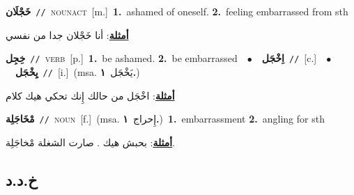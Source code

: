\documentclass[10pt,a4paper,twoside]{article} %
\begin{document}
\begin{multicols}{2}
{\setlength\topsep{0pt}\textbf{\foreignlanguage{arabic}{خَجْلَان}}\ {\color{gray}\texttt{//}\color{black}}\ \textsc{noun\textunderscore act}\ [m.]\ \textbf{1.}~ashamed of oneself.  \textbf{2.}~feeling embarrassed from sth\  \begin{flushright}\color{gray}\foreignlanguage{arabic}{\textbf{\underline{\foreignlanguage{arabic}{أمثلة}}}: أنا خَجْلان جدا من نفسي}\end{flushright}\color{black}} \vspace{2mm}

{\setlength\topsep{0pt}\textbf{\foreignlanguage{arabic}{خِجِل}}\ {\color{gray}\texttt{//}\color{black}}\ \textsc{verb}\ [p.]\ \textbf{1.}~be ashamed.  \textbf{2.}~be embarrassed\ \ $\bullet$\ \ \setlength\topsep{0pt}\textbf{\foreignlanguage{arabic}{اِخْجَل}}\ {\color{gray}\texttt{//}\color{black}}\ [c.]\ \ $\bullet$\ \ \setlength\topsep{0pt}\textbf{\foreignlanguage{arabic}{يِخْجَل}}\ {\color{gray}\texttt{//}\color{black}}\ [i.]\ \color{gray}(msa. \foreignlanguage{arabic}{يَخْجَل}~\foreignlanguage{arabic}{\textbf{١.}})\color{black}\  \begin{flushright}\color{gray}\foreignlanguage{arabic}{\textbf{\underline{\foreignlanguage{arabic}{أمثلة}}}: اخْجَل من حالك إِنك تحكي هيك كلام}\end{flushright}\color{black}} \vspace{2mm}

{\setlength\topsep{0pt}\textbf{\foreignlanguage{arabic}{مْخَاجَلِة}}\ {\color{gray}\texttt{//}\color{black}}\ \textsc{noun}\ [f.]\ \color{gray}(msa. \foreignlanguage{arabic}{إِحراج}~\foreignlanguage{arabic}{\textbf{١.}})\color{black}\ \textbf{1.}~embarrassment  \textbf{2.}~angling for sth\  \begin{flushright}\color{gray}\foreignlanguage{arabic}{\textbf{\underline{\foreignlanguage{arabic}{أمثلة}}}: بحبش هيك . صارت الشغلة مْخاجَلِة.}\end{flushright}\color{black}} \vspace{2mm}

\vspace{-3mm}
\subsection*{\color{blue}\foreignlanguage{arabic}{خ.د.د}\color{blue}{}} 


\end{multicols}
\end{document}
